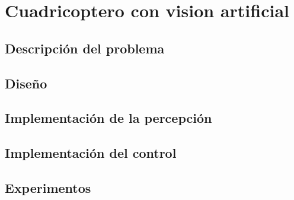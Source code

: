 \chapter{Cuadricoptero con vision artificial}\label{sec: Cuadricoptero}


\section{Descripción del problema}
\section{Diseño}
\section{Implementación de la percepción}
\section{Implementación del control}
\section{Experimentos}









